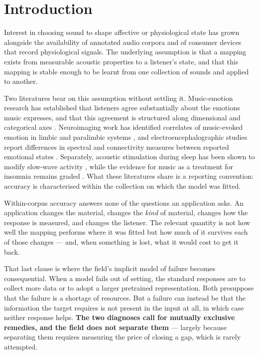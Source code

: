\section*{Introduction}

Interest in choosing sound to shape affective or physiological state has grown
alongside the availability of annotated audio corpora and of consumer devices that
record physiological signals. The underlying assumption is that a mapping exists
from measurable acoustic properties to a listener's state, and that this mapping is
stable enough to be learnt from one collection of sounds and applied to another.

Two literatures bear on this assumption without settling it. Music-emotion research
has established that listeners agree substantially about the emotions music
expresses, and that this agreement is structured along dimensional and categorical
axes \citep{russell1980,eerola2013}. Neuroimaging work has identified correlates of
music-evoked emotion in limbic and paralimbic systems \citep{koelsch2014}, and
electroencephalographic studies report differences in spectral and connectivity
measures between reported emotional states \citep{daly2014}. Separately, acoustic
stimulation during sleep has been shown to modify slow-wave activity
\citep{papalambros2017}, while the evidence for music as a treatment for insomnia
remains graded \citep{jespersen2022}. What these literatures share is a reporting
convention: accuracy is characterised within the collection on which the model was
fitted.

Within-corpus accuracy answers none of the questions an application asks. An
application changes the material, changes the \emph{kind} of material, changes how
the response is measured, and changes the listener. The relevant quantity is not
how well the mapping performs where it was fitted but how much of it survives each
of those changes --- and, when something is lost, what it would cost to get it back.

That last clause is where the field's implicit model of failure becomes consequential.
When a model fails out of setting, the standard responses are to collect more data
or to adopt a larger pretrained representation. Both presuppose that the failure is
a shortage of resources. But a failure can instead be that the information the
target requires is not present in the input at all, in which case neither response
helps. \textbf{The two diagnoses call for mutually exclusive remedies, and the field
does not separate them} --- largely because separating them requires measuring the
price of closing a gap, which is rarely attempted.

